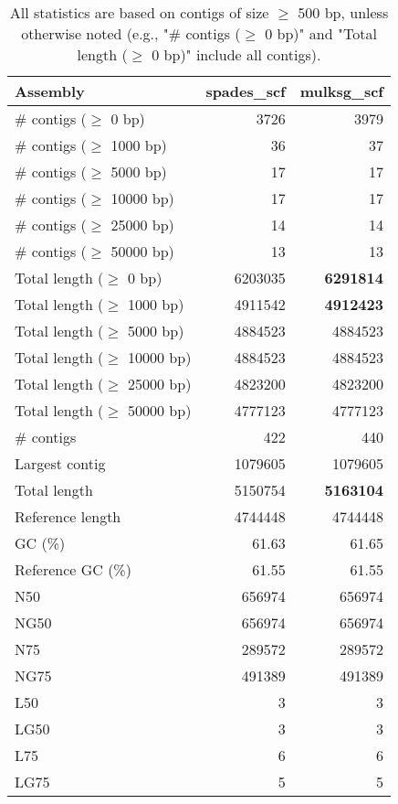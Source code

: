 \documentclass[12pt,a4paper]{article}
\begin{document}
\begin{table}[ht]
\begin{center}
\caption{All statistics are based on contigs of size $\geq$ 500 bp, unless otherwise noted (e.g., "\# contigs ($\geq$ 0 bp)" and "Total length ($\geq$ 0 bp)" include all contigs).}
\begin{tabular}{|l*{2}{|r}|}
\hline
Assembly & spades\_scf & mulksg\_scf \\ \hline
\# contigs ($\geq$ 0 bp) & 3726 & 3979 \\ \hline
\# contigs ($\geq$ 1000 bp) & 36 & 37 \\ \hline
\# contigs ($\geq$ 5000 bp) & 17 & 17 \\ \hline
\# contigs ($\geq$ 10000 bp) & 17 & 17 \\ \hline
\# contigs ($\geq$ 25000 bp) & 14 & 14 \\ \hline
\# contigs ($\geq$ 50000 bp) & 13 & 13 \\ \hline
Total length ($\geq$ 0 bp) & 6203035 & {\bf 6291814} \\ \hline
Total length ($\geq$ 1000 bp) & 4911542 & {\bf 4912423} \\ \hline
Total length ($\geq$ 5000 bp) & 4884523 & 4884523 \\ \hline
Total length ($\geq$ 10000 bp) & 4884523 & 4884523 \\ \hline
Total length ($\geq$ 25000 bp) & 4823200 & 4823200 \\ \hline
Total length ($\geq$ 50000 bp) & 4777123 & 4777123 \\ \hline
\# contigs & 422 & 440 \\ \hline
Largest contig & 1079605 & 1079605 \\ \hline
Total length & 5150754 & {\bf 5163104} \\ \hline
Reference length & 4744448 & 4744448 \\ \hline
GC (\%) & 61.63 & 61.65 \\ \hline
Reference GC (\%) & 61.55 & 61.55 \\ \hline
N50 & 656974 & 656974 \\ \hline
NG50 & 656974 & 656974 \\ \hline
N75 & 289572 & 289572 \\ \hline
NG75 & 491389 & 491389 \\ \hline
L50 & 3 & 3 \\ \hline
LG50 & 3 & 3 \\ \hline
L75 & 6 & 6 \\ \hline
LG75 & 5 & 5 \\ \hline

\end{tabular}
\end{center}
\end{table}
\end{document}
